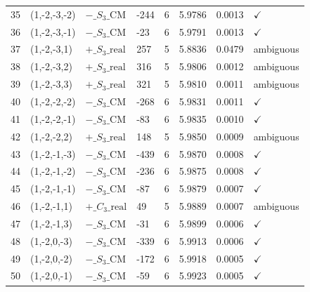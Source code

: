 \begin{table}[ht]
\begin{tabular}{rlllrlll}
35 & (1,-2,-3,-2) & $-\_S_3\_\mathrm{CM}$ & -244 & 6 & 5.9786 & 0.0013 & $\checkmark$ \\
36 & (1,-2,-3,-1) & $-\_S_3\_\mathrm{CM}$ & -23 & 6 & 5.9791 & 0.0013 & $\checkmark$ \\
37 & (1,-2,-3,1) & $+\_S_3\_\mathrm{real}$ & 257 & 5 & 5.8836 & 0.0479 & ambiguous \\
38 & (1,-2,-3,2) & $+\_S_3\_\mathrm{real}$ & 316 & 5 & 5.9806 & 0.0012 & ambiguous \\
39 & (1,-2,-3,3) & $+\_S_3\_\mathrm{real}$ & 321 & 5 & 5.9810 & 0.0011 & ambiguous \\
40 & (1,-2,-2,-2) & $-\_S_3\_\mathrm{CM}$ & -268 & 6 & 5.9831 & 0.0011 & $\checkmark$ \\
41 & (1,-2,-2,-1) & $-\_S_3\_\mathrm{CM}$ & -83 & 6 & 5.9835 & 0.0010 & $\checkmark$ \\
42 & (1,-2,-2,2) & $+\_S_3\_\mathrm{real}$ & 148 & 5 & 5.9850 & 0.0009 & ambiguous \\
43 & (1,-2,-1,-3) & $-\_S_3\_\mathrm{CM}$ & -439 & 6 & 5.9870 & 0.0008 & $\checkmark$ \\
44 & (1,-2,-1,-2) & $-\_S_3\_\mathrm{CM}$ & -236 & 6 & 5.9875 & 0.0008 & $\checkmark$ \\
45 & (1,-2,-1,-1) & $-\_S_3\_\mathrm{CM}$ & -87 & 6 & 5.9879 & 0.0007 & $\checkmark$ \\
46 & (1,-2,-1,1) & $+\_C_3\_\mathrm{real}$ & 49 & 5 & 5.9889 & 0.0007 & ambiguous \\
47 & (1,-2,-1,3) & $-\_S_3\_\mathrm{CM}$ & -31 & 6 & 5.9899 & 0.0006 & $\checkmark$ \\
48 & (1,-2,0,-3) & $-\_S_3\_\mathrm{CM}$ & -339 & 6 & 5.9913 & 0.0006 & $\checkmark$ \\
49 & (1,-2,0,-2) & $-\_S_3\_\mathrm{CM}$ & -172 & 6 & 5.9918 & 0.0005 & $\checkmark$ \\
50 & (1,-2,0,-1) & $-\_S_3\_\mathrm{CM}$ & -59 & 6 & 5.9923 & 0.0005 & $\checkmark$ \\
\hline
\end{tabular}
\end{table}
